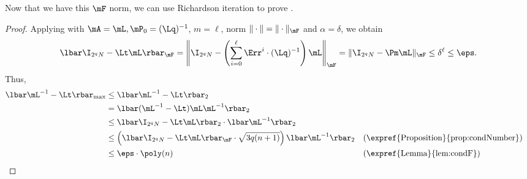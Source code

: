 \documentclass{toc}
\begin{document}
Now that we have this $\mF$ norm, we can use Richardson iteration to prove .
\begin{proof}
Applying  with $\mA=\mL,\mP_0=(\Lq)^{-1}$, $m=\ell $, norm $\|\cdot\|=\|\cdot\|_\mF$ and $\alpha=\delta$, we obtain
\[\lbar\I_{2^qN}-\Lt \mL\rbar_\mF = \left\|\I_{2^qN}-\left(\sum_{i=0}^\ell \Err^i\cdot (\Lq)^{-1}\right)\mL\right\|_\mF
    = \|\I_{2^qN}-\Pm\mL\|_\mF
    \leq \delta^\ell
    \leq \eps.\]
Thus,
\begin{align*}
    \lbar\mL^{-1}-\Lt\rbar_{\max} &\leq \lbar\mL^{-1}-\Lt\rbar_{2}\\
    &= \lbar(\mL^{-1}-\Lt)\mL \mL^{-1}\rbar_2\\
    &\leq \lbar\I_{2^qN}-\Lt\mL\rbar_2\cdot\lbar\mL^{-1}\rbar_2\\
    &\leq \left(\lbar\I_{2^qN}-\Lt\mL\rbar_\mF\cdot \sqrt{3q(n+1)}\right) \lbar\mL^{-1}\rbar_2&& \text{(\expref{Proposition}{prop:condNumber})}\\
    &\leq \eps \cdot\poly(n) && \text{(\expref{Lemma}{lem:condF})}\qedhere
\end{align*}
\end{proof}
\end{document}
